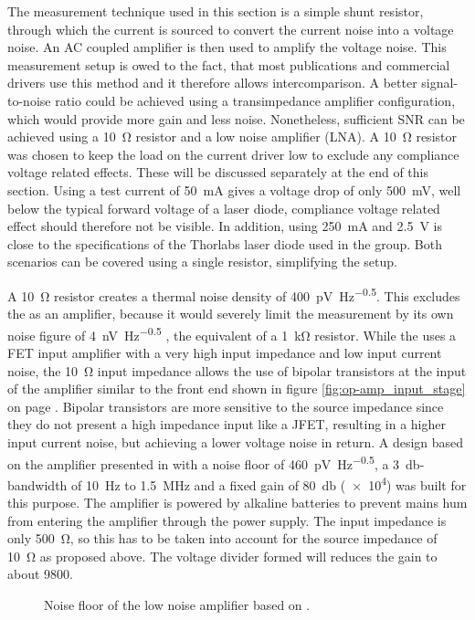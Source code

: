The measurement technique used in this section is a simple shunt resistor, through which the current is sourced to convert the current noise into a voltage noise. An AC coupled amplifier is then used to amplify the voltage noise. This measurement setup is owed to the fact, that most publications \cite{laser_driver_digital,laser_driver_qcl_taubman,libbrecht_hall,laser_driver_mosfet_noise} and commercial drivers \cite{datasheet_LQprO,moglabs_noise_noise_measurement,datasheet_vescent_laser_driver} use this method and it therefore allows intercomparison. A better signal-to-noise ratio could be achieved using a transimpedance amplifier configuration, which would provide more gain and less noise. Nonetheless, sufficient SNR can be achieved using a \qty{10}{\ohm} resistor and a low noise amplifier (LNA). A \qty{10}{\ohm} resistor was chosen to keep the load on the current driver low to exclude any compliance voltage related effects. These will be discussed separately at the end of this section. Using a test current of \qty{50}{\mA} gives a voltage drop of only \qty{500}{\mV}, well below the typical forward voltage of a laser diode, compliance voltage related effect should therefore not be visible. In addition, using \qty{250}{\mA} and \qty{2.5}{\V} is close to the specifications of the Thorlabs  \cite{datasheet_thorlabs_780nm} laser diode used in the group. Both scenarios can be covered using a single resistor, simplifying the setup.

A \qty{10}{\ohm} resistor creates a thermal noise density of \qty{400}{\pV \per \Hz\tothe{0.5}}. This excludes the  as an amplifier, because it would severely limit the measurement by its own noise figure of \qty{4}{\nV \per \Hz\tothe{0.5}} \cite{datasheet_SR560}, the equivalent of a \qty{1}{\kilo\ohm} resistor. While the  uses a FET input amplifier with a very high input impedance and low input current noise, the \qty{10}{\ohm} input impedance allows the use of bipolar transistors at the input of the amplifier similar to the front end shown in figure \ref{fig:op-amp_input_stage} on page \pageref{fig:op-amp_input_stage}. Bipolar transistors are more sensitive to the source impedance since they do not present a high impedance input like a JFET, resulting in a higher input current noise, but achieving a lower voltage noise in return. A design based on the amplifier presented in \cite{appnote_low_noise_amp} with a noise floor of \qty{460}{\pV \per \Hz\tothe{0.5}}, a \qty{3}{\decibel}-bandwidth of \qty{10}{\Hz} to \qty{1.5}{\MHz} and a fixed gain of \qty{80}{\decibel} (\num{e4}) was built for this purpose. The amplifier is powered by alkaline batteries to prevent mains hum from entering the amplifier through the power supply. The input impedance is only \qty{500}{\ohm}, so this has to be taken into account for the source impedance of \qty{10}{\ohm} as proposed above. The voltage divider formed will reduces the gain to about \num{9800}.
\begin{figure}[ht]
    \centering
    
    \caption{Noise floor of the low noise amplifier based on \cite{appnote_low_noise_amp}.}
    \label{fig:noise_lna}
\end{figure}

